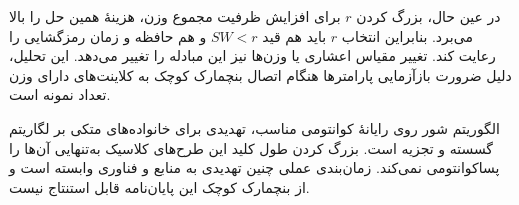 در عین حال، بزرگ کردن $r$ برای افزایش ظرفیت مجموع وزن، هزینۀ همین حل را بالا می‌برد. بنابراین انتخاب $r$ باید هم قید $SW<r$ و هم حافظه و زمان رمزگشایی را رعایت کند. تغییر مقیاس اعشاری یا وزن‌ها نیز این مبادله را تغییر می‌دهد. این تحلیل، دلیل ضرورت بازآزمایی پارامترها هنگام اتصال بنچمارک کوچک به کلاینت‌های دارای وزن تعداد نمونه است.

الگوریتم شور روی رایانۀ کوانتومی مناسب، تهدیدی برای خانواده‌های متکی بر لگاریتم گسسته و تجزیه است. بزرگ کردن طول کلید این طرح‌های کلاسیک به‌تنهایی آن‌ها را پساکوانتومی نمی‌کند. زمان‌بندی عملی چنین تهدیدی به منابع و فناوری وابسته است و از بنچمارک کوچک این پایان‌نامه قابل استنتاج نیست.

